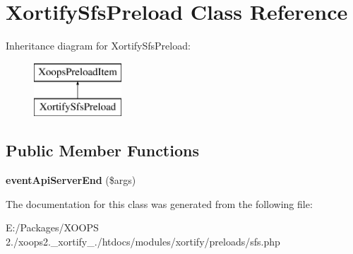 \hypertarget{class_xortify_sfs_preload}{\section{Xortify\-Sfs\-Preload Class Reference}
\label{class_xortify_sfs_preload}
}
Inheritance diagram for Xortify\-Sfs\-Preload\-:\begin{figure}[H]
\begin{center}
\leavevmode
\includegraphics[height=2.000000cm]{class_xortify_sfs_preload}
\end{center}
\end{figure}
\subsection*{Public Member Functions}
\begin{DoxyCompactItemize}
\item 
\hypertarget{class_xortify_sfs_preload_adc22e04a0640a2ba6264320d6c348ae0}{{\bfseries event\-Api\-Server\-End} (\$args)}\label{class_xortify_sfs_preload_adc22e04a0640a2ba6264320d6c348ae0}

\end{DoxyCompactItemize}


The documentation for this class was generated from the following file\-:\begin{DoxyCompactItemize}
\item 
E\-:/\-Packages/\-X\-O\-O\-P\-S 2./xoops2.\-\_\-xortify\-\_./htdocs/modules/xortify/preloads/sfs.\-php\end{DoxyCompactItemize}
